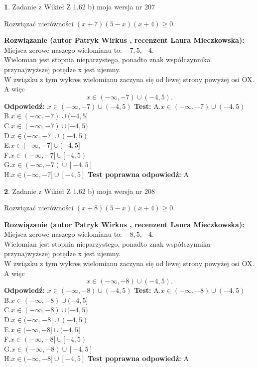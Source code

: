 \documentclass[12pt, a4paper]{article}
\theoremstyle{definition} %
\newtheorem{zad}{}
\newcommand{\zadStart}[1]{\begin{zad}#1\newline}
\newcommand{\zadStop}{\end{zad}}
\newcommand{\rozwStart}[2]{\noindent \textbf{Rozwiązanie (autor #1 , recenzent #2): }\newline}
\newcommand{\rozwStop}{\newline}
\newcommand{\odpStart}{\noindent \textbf{Odpowiedź:}\newline}
\newcommand{\odpStop}{\newline}
\newcommand{\testStart}{\noindent \textbf{Test:}\newline}
\newcommand{\testStop}{\newline}
\newcommand{\kluczStart}{\noindent \textbf{Test poprawna odpowiedź:}\newline}
\newcommand{\kluczStop}{\newline}
\begin{document}
\zadStart{Zadanie z Wikieł Z 1.62 b) moja wersja nr 207}

Rozwiązać nierówności $(x+7)(5-x)(x+4)\ge0$.
\zadStop
\rozwStart{Patryk Wirkus}{Laura Mieczkowska}
Miejsca zerowe naszego wielomianu to: $-7, 5, -4$.\\
Wielomian jest stopnia nieparzystego, ponadto znak współczynnika przy\linebreak najwyższej potędze x jest ujemny.\\ W związku z tym wykres wielomianu zaczyna się od lewej strony powyżej osi OX. A więc $$x \in (-\infty,-7) \cup (-4,5).$$
\rozwStop
\odpStart
$x \in (-\infty,-7) \cup (-4,5)$
\odpStop
\testStart
A.$x \in (-\infty,-7) \cup (-4,5)$\\
B.$x \in (-\infty,-7) \cup (-4,5]$\\
C.$x \in (-\infty,-7) \cup [-4,5)$\\
D.$x \in (-\infty,-7] \cup (-4,5)$\\
E.$x \in (-\infty,-7] \cup (-4,5]$\\
F.$x \in (-\infty,-7] \cup [-4,5)$\\
G.$x \in (-\infty,-7) \cup [-4,5]$\\
H.$x \in (-\infty,-7] \cup [-4,5]$
\testStop
\kluczStart
A
\kluczStop



\zadStart{Zadanie z Wikieł Z 1.62 b) moja wersja nr 208}

Rozwiązać nierówności $(x+8)(5-x)(x+4)\ge0$.
\zadStop
\rozwStart{Patryk Wirkus}{Laura Mieczkowska}
Miejsca zerowe naszego wielomianu to: $-8, 5, -4$.\\
Wielomian jest stopnia nieparzystego, ponadto znak współczynnika przy\linebreak najwyższej potędze x jest ujemny.\\ W związku z tym wykres wielomianu zaczyna się od lewej strony powyżej osi OX. A więc $$x \in (-\infty,-8) \cup (-4,5).$$
\rozwStop
\odpStart
$x \in (-\infty,-8) \cup (-4,5)$
\odpStop
\testStart
A.$x \in (-\infty,-8) \cup (-4,5)$\\
B.$x \in (-\infty,-8) \cup (-4,5]$\\
C.$x \in (-\infty,-8) \cup [-4,5)$\\
D.$x \in (-\infty,-8] \cup (-4,5)$\\
E.$x \in (-\infty,-8] \cup (-4,5]$\\
F.$x \in (-\infty,-8] \cup [-4,5)$\\
G.$x \in (-\infty,-8) \cup [-4,5]$\\
H.$x \in (-\infty,-8] \cup [-4,5]$
\testStop
\kluczStart
A
\kluczStop
\end{document}

